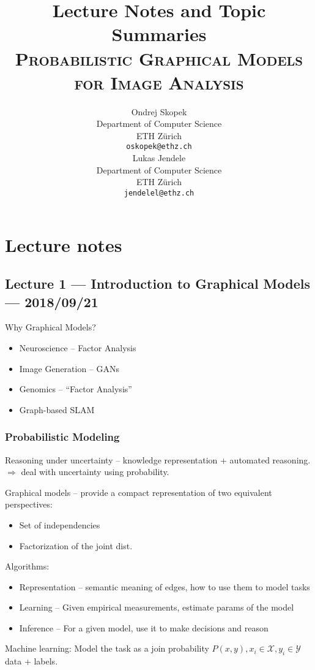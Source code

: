 \documentclass{article}
\title{Lecture Notes and Topic Summaries\\{\normalfont\large \textsc{Probabilistic Graphical Models for Image Analysis}}}
\author{
  Ondrej Skopek\\
  Department of Computer Science\\
  ETH Z\"{u}rich\\
  \texttt{oskopek@ethz.ch}\\
  \And
  Lukas Jendele\\
  Department of Computer Science\\
  ETH Z\"{u}rich\\
  \texttt{jendelel@ethz.ch}\\
}
\begin{document}
\maketitle

\section{Lecture notes}

\subsection{Lecture 1 --- Introduction to Graphical Models --- 2018/09/21}

Why Graphical Models?

\begin{itemize}
    \item Neuroscience -- Factor Analysis
    \item Image Generation -- GANs
    \item Genomics -- ``Factor Analysis''
    \item Graph-based SLAM
\end{itemize}

\subsubsection{Probabilistic Modeling}

Reasoning under uncertainty -- knowledge representation + automated reasoning. $\Rightarrow$ deal with uncertainty using probability.

Graphical models -- provide a compact representation of two equivalent perspectives:
\begin{itemize}
    \item Set of independencies
    \item Factorization of the joint dist.
\end{itemize}

Algorithms:
\begin{itemize}
    \item Representation -- semantic meaning of edges, how to use them to model tasks
    \item Learning -- Given empirical measurements, estimate params of the model
    \item Inference -- For a given model, use it to make decisions and reason
\end{itemize}

Machine learning: Model the task as a join probability $P(x, y), x_i \in \mathcal{X}, y_i \in \mathcal{Y}$ data + labels.
\end{document}
